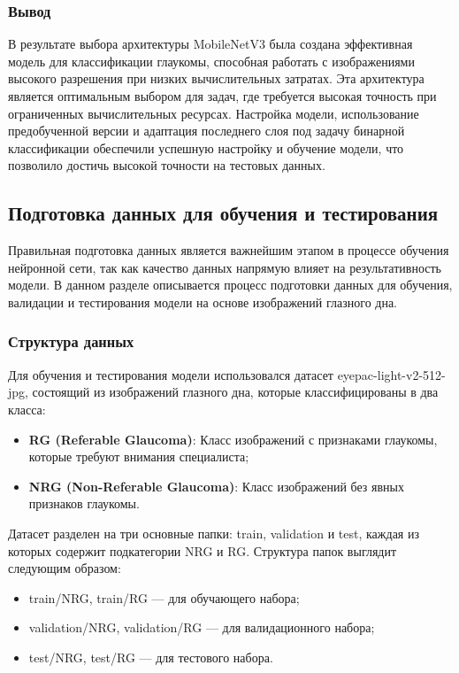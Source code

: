 {    \subsubsection*{Вывод}

    В результате выбора архитектуры MobileNetV3 была создана эффективная модель для классификации глаукомы, способная работать с изображениями высокого разрешения при низких вычислительных затратах. Эта архитектура является оптимальным выбором для задач, где требуется высокая точность при ограниченных вычислительных ресурсах. Настройка модели, использование предобученной версии и адаптация последнего слоя под задачу бинарной классификации обеспечили успешную настройку и обучение модели, что позволило достичь высокой точности на тестовых данных.


    \subsection{Подготовка данных для обучения и тестирования}

    Правильная подготовка данных является важнейшим этапом в процессе обучения нейронной сети, так как качество данных напрямую влияет на результативность модели. В данном разделе описывается процесс подготовки данных для обучения, валидации и тестирования модели на основе изображений глазного дна.

    \subsubsection*{Структура данных}

    Для обучения и тестирования модели использовался датасет eyepac-light-v2-512-jpg, состоящий из изображений глазного дна, которые классифицированы в два класса:
    \begin{itemize}
        \item \textbf{RG (Referable Glaucoma)}: Класс изображений с признаками глаукомы, которые требуют внимания специалиста;
        \item \textbf{NRG (Non-Referable Glaucoma)}: Класс изображений без явных признаков глаукомы.
    \end{itemize}

    Датасет разделен на три основные папки: train, validation и test, каждая из которых содержит подкатегории NRG и RG. Структура папок выглядит следующим образом:
    \begin{itemize}
        \item train/NRG, train/RG — для обучающего набора;
        \item validation/NRG, validation/RG — для валидационного набора;
        \item test/NRG, test/RG — для тестового набора.
    \end{itemize}

}
